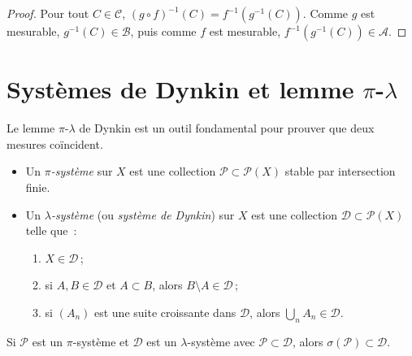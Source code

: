 \begin{proof}
Pour tout $C \in \mathcal{C}$, $(g \circ f)^{-1}(C) = f^{-1}(g^{-1}(C))$.
Comme $g$ est mesurable, $g^{-1}(C) \in \mathcal{B}$, puis comme $f$ est mesurable,
$f^{-1}(g^{-1}(C)) \in \mathcal{A}$.
\end{proof}

\section{Syst\`emes de Dynkin et lemme $\pi$-$\lambda$}

Le lemme $\pi$-$\lambda$ de Dynkin est un outil fondamental pour prouver que deux
mesures co\"incident.

\begin{definition}
\begin{itemize}
    \item Un \emph{$\pi$-syst\`eme} sur $X$ est une collection $\mathcal{P}
    \subset \mathcal{P}(X)$ stable par intersection finie.
    \item Un \emph{$\lambda$-syst\`eme} (ou \emph{syst\`eme de Dynkin}) sur $X$ est
    une collection $\mathcal{D} \subset \mathcal{P}(X)$ telle que~:
    \begin{enumerate}
        \item[(i)] $X \in \mathcal{D}$\,;
        \item[(ii)] si $A, B \in \mathcal{D}$ et $A \subset B$, alors
        $B \setminus A \in \mathcal{D}$\,;
        \item[(iii)] si $(A_n)$ est une suite croissante dans $\mathcal{D}$,
        alors $\bigcup_n A_n \in \mathcal{D}$.
    \end{enumerate}
\end{itemize}
\end{definition}

\begin{theoreme}
\label{thm:pi_lambda}
Si $\mathcal{P}$ est un $\pi$-syst\`eme et $\mathcal{D}$ est un $\lambda$-syst\`eme
avec $\mathcal{P} \subset \mathcal{D}$, alors $\sigma(\mathcal{P}) \subset
\mathcal{D}$.
\end{theoreme}

